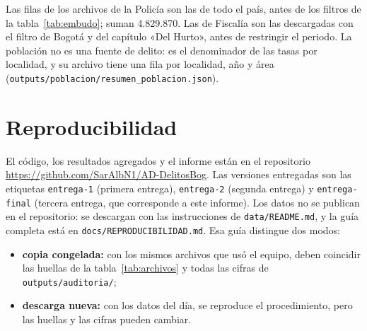Las filas de los archivos de la Policía son las de todo el país, antes de los filtros de la tabla~\ref{tab:embudo}; suman 4.829.870. Las de Fiscalía son las descargadas con el filtro de Bogotá y del capítulo «Del Hurto», antes de restringir el periodo. La población no es una fuente de delito: es el denominador de las tasas por localidad, y su archivo tiene una fila por localidad, año y área (\texttt{outputs/poblacion/resumen\_poblacion.json}).

\section{Reproducibilidad}\label{ap:reproducibilidad}

El código, los resultados agregados y el informe están en el repositorio \url{https://github.com/SarAlbN1/AD-DelitosBog}. Las versiones entregadas son las etiquetas \texttt{entrega-1} (primera entrega), \texttt{entrega-2} (segunda entrega) y \texttt{entrega-final} (tercera entrega, que corresponde a este informe). Los datos no se publican en el repositorio: se descargan con las instrucciones de \texttt{data/README.md}, y la guía completa está en \texttt{docs/REPRODUCIBILIDAD.md}. Esa guía distingue dos modos:
\begin{itemize}
  \item \textbf{copia congelada:} con los mismos archivos que usó el equipo, deben coincidir las huellas de la tabla~\ref{tab:archivos} y todas las cifras de \texttt{outputs/auditoria/};
  \item \textbf{descarga nueva:} con los datos del día, se reproduce el procedimiento, pero las huellas y las cifras pueden cambiar.
\end{itemize}

